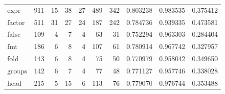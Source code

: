 \begin{tabular}{lrrrrrrrrr}
expr      &                    911 &                                 15 &                                38 &                               27 &                               489 &                             342 &                                0.803238 &                               0.983535 &                             0.375412 \\
factor    &                    511 &                                 31 &                                27 &                               24 &                               187 &                             242 &                                0.784736 &                               0.939335 &                             0.473581 \\
false     &                    109 &                                  4 &                                 7 &                                4 &                                63 &                              31 &                                0.752294 &                               0.963303 &                             0.284404 \\
fmt       &                    186 &                                  6 &                                 8 &                                4 &                               107 &                              61 &                                0.780914 &                               0.967742 &                             0.327957 \\
fold      &                    143 &                                  6 &                                 8 &                                4 &                                75 &                              50 &                                0.770979 &                               0.958042 &                             0.349650 \\
groups    &                    142 &                                  6 &                                 7 &                                4 &                                77 &                              48 &                                0.771127 &                               0.957746 &                             0.338028 \\
head      &                    215 &                                  5 &                                15 &                                6 &                               113 &                              76 &                                0.779070 &                               0.976744 &                             0.353488 \\

\end{tabular}
